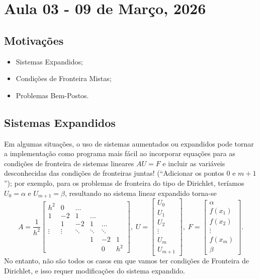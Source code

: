 \documentclass[../differential_methods.tex]{subfiles}
\begin{document}
\section{Aula 03 - 09 de Março, 2026}
\subsection{Motivações}
\begin{itemize}
	\item Sistemas Expandidos;
	\item Condições de Fronteira Mistas;
	\item Problemas Bem-Postos.
\end{itemize}
\subsection{Sistemas Expandidos}
Em algumas situações, o uso de sistemas aumentados ou expandidos pode tornar a implementação como programa mais fácil ao incorporar equações para as condições de fronteira de sistemas lineares \(AU = F\) e incluir as variáveis desconhecidas das condições de fronteiras juntas! (``Adicionar os pontos \(0\) e \(m+1\)''); por exemplo, para os problemas de fronteira do tipo de Dirichlet, teríamos \(U_{0}=\alpha \) e \(U_{m+1}=\beta \), resultando no sistema linear expandido torna-se
\[
	A = \frac{1}{h^{2}}\begin{bmatrix}
		h^{2}  & 0      & \dotsc &        &        &       \\
		1      & -2     & 1      & \dotsc &        &       \\
		       & 1      & -2     & 1      & \dotsc &       \\
		\vdots & \vdots & \ddots & \ddots & \ddots &       \\
		       &        &        & 1      & -2     & 1     \\
		       &        &        &        & 0      & h^{2}
	\end{bmatrix}, \; U = \begin{bmatrix}
		U_{0}  \\
		U_{1}  \\
		U_{2}  \\
		\vdots \\
		U_{m}  \\
		U_{m+1}
	\end{bmatrix},\; F = \begin{bmatrix}
		\alpha   \\
		f(x_1)   \\
		f(x_2)   \\
		\vdots   \\
		f(x_{m}) \\
		\beta
	\end{bmatrix}.
\]
No entanto, não são todos os casos em que vamos ter condições de Fronteira de Dirichlet, e isso requer modificações do sistema expandido.
\end{document}
